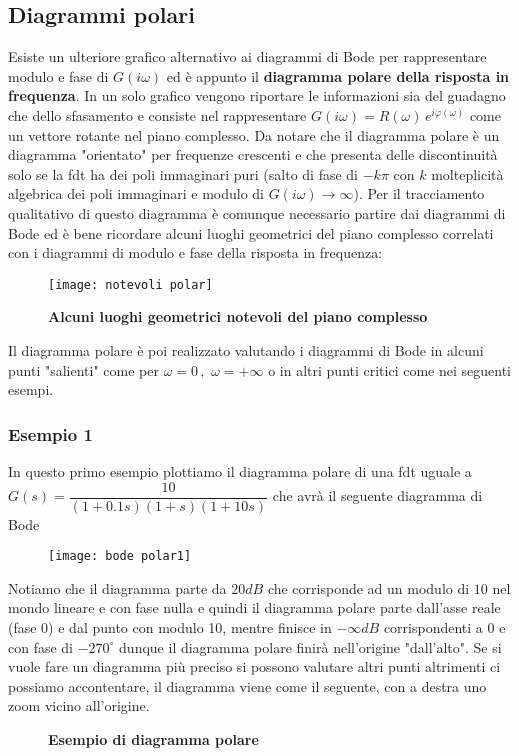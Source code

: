\documentclass[a4paper]{article}
\begin{document}
	\subsection{Diagrammi polari}
	Esiste un ulteriore grafico alternativo ai diagrammi di Bode per rappresentare modulo e fase di $ G(i\omega) $ ed è appunto il \textbf{diagramma polare della risposta in frequenza}. In un solo grafico vengono riportare le informazioni sia del guadagno che dello sfasamento e consiste nel rappresentare $ G(i\omega)=R(\omega)\,e^{i\varphi(\omega)} $ come un vettore rotante nel piano complesso. Da notare che il diagramma polare è un diagramma "orientato" per frequenze crescenti e che presenta delle discontinuità solo se la fdt ha dei poli immaginari puri (salto di fase di $ -k\pi $ con $ k $ molteplicità algebrica dei poli immaginari e modulo  di $ G(i\omega)\to\infty$). Per il tracciamento qualitativo di questo diagramma è comunque necessario partire dai diagrammi di Bode ed è bene ricordare alcuni luoghi geometrici del piano complesso correlati con i diagrammi di modulo e fase della risposta in frequenza:
	\begin{figure}[H]
		\centering
		\texttt{[image: notevoli polar]}
		\caption{\textbf{Alcuni luoghi geometrici notevoli del piano complesso}}
	\end{figure}
	Il diagramma polare è poi realizzato valutando i diagrammi di Bode in alcuni punti "salienti" come per $ \omega=0\,,\,\,\omega=+\infty $ o in altri punti critici come nei seguenti esempi.
	
	\subsubsection*{Esempio 1}
	In questo primo esempio plottiamo il diagramma polare di una fdt uguale a\\ $ G(s)=\dfrac{10}{(1+0.1s)(1+s)(1+10s)} $ che avrà il seguente diagramma di Bode
	\begin{figure}[H]
		\centering
		\texttt{[image: bode polar1]}
	\end{figure}
	Notiamo che il diagramma parte da $ 20dB $ che corrisponde ad un modulo di  $ 10 $ nel mondo lineare e con fase nulla e quindi il diagramma polare parte dall'asse reale (fase 0) e dal punto con modulo 10, mentre finisce in $ -\infty dB $ corrispondenti a $ 0 $ e con fase di $ -270^{\circ} $ dunque il diagramma polare finirà nell'origine "dall'alto". Se si vuole fare un diagramma più preciso si possono valutare altri punti altrimenti ci possiamo accontentare, il diagramma viene come il seguente, con a destra uno zoom vicino all'origine.
	\begin{figure}[H]
		\centering
		\qquad %
		\caption{\textbf{Esempio di diagramma polare}}
	\end{figure}
	
\end{document}
